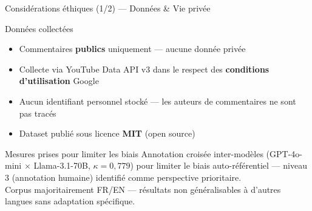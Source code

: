 \documentclass[aspectratio=169, 12pt]{beamer}
\begin{document}
\begin{frame}{Considérations éthiques (1/2) — Données \& Vie privée}

  \begin{block}{Données collectées}
    \begin{itemize}
      \item Commentaires \textbf{publics} uniquement — aucune donnée privée
      \item Collecte via YouTube Data API v3 dans le respect des
            \textbf{conditions d'utilisation} Google
      \item Aucun identifiant personnel stocké — les auteurs de
            commentaires ne sont pas tracés
      \item Dataset publié sous licence \textbf{MIT} (open source)
    \end{itemize}
  \end{block}

  \vspace{0.4cm}
  \begin{exampleblock}{Mesures prises pour limiter les biais}
    \small
    Annotation croisée inter-modèles (GPT-4o-mini $\times$ Llama-3.1-70B,
    $\kappa = 0{,}779$) pour limiter le biais auto-référentiel — niveau 3
    (annotation humaine) identifié comme perspective prioritaire.\\[0.3em]
    Corpus majoritairement FR/EN — résultats non généralisables à d'autres
    langues sans adaptation spécifique.
  \end{exampleblock}

\end{frame}
\end{document}
